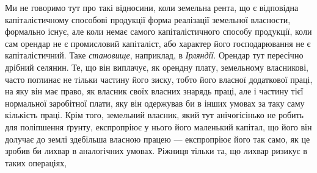 Ми не говоримо тут про такі відносини, коли земельна рента, що є відповідна
капіталістичному способові продукції форма реалізації земельної власности,
формально існує, але коли немає самого капіталістичного способу продукції,
коли сам орендар не є промисловий капіталіст, або характер його господарювання
не є капіталістичний. Таке \emph{становище}, наприклад, в \emph{Ірляндії}. Орендар
тут пересічно дрібний селянин. Те, що він виплачує, як орендну плату, земельному
власникові, часто поглинає не тільки частину його зиску, тобто його
власної додаткової праці, на яку він має право, як власник своїх власних
знарядь праці, але і частину тієї нормальної заробітної плати, яку він одержував
би в інших умовах за таку саму кількість праці. Крім того, земельний
власник, який тут анічогісінько не робить для поліпшення ґрунту, експропріює
у нього його маленький капітал, що його він долучає до землі здебільша
власною працею — експропріює його так само, як це зробив би лихвар в аналогічних
умовах. Ріжниця тільки та, що лихвар ризикує в таких операціях,
\parbreak{}  %
